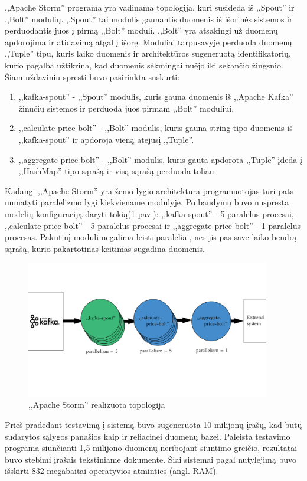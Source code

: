\documentclass{VUMIFPSkursinis}
\begin{document}
,,Apache Storm'' programa yra vadinama topologija, kuri susideda iš ,,Spout'' ir ,,Bolt'' modulių. ,,Spout'' tai modulis gaunantis duomenis
iš išorinės sistemos ir perduodantis juos į pirmą ,,Bolt'' modulį. ,,Bolt'' yra atsakingi už duomenų apdorojima ir atidavimą atgal į išorę.
Moduliai tarpusavyje perduoda duomenų ,,Tuple'' tipu, kuris laiko duomenis ir architektūros sugeneruotą identifikatorių, 
kurio pagalba užtikrina, kad duomenis sėkmingai nuėjo iki sekančio žingsnio. 
Šiam uždaviniu spresti buvo pasirinkta suskurti:
\begin{enumerate}
    \item ,,kafka-spout'' - ,,Spout'' modulis, kuris gauna duomenis iš ,,Apache Kafka'' žinučių sistemos ir perduoda juos pirmam ,,Bolt'' moduliui.
    \item ,,calculate-price-bolt'' - ,,Bolt'' modulis, kuris gauna string tipo duomenis iš ,,kafka-spout'' ir apdoroja vieną atejusį ,,Tuple''.
    \item ,,aggregate-price-bolt'' - ,,Bolt'' modulis, kuris gauta apdorota ,,Tuple'' įdeda į ,,HashMap'' tipo sąrašą ir visą sąrašą perduoda toliau.  
\end{enumerate}\par
Kadangi ,,Apache Storm'' yra žemo lygio architektūra programuotojas turi pats numatyti paralelizmo lygi kiekviename modulyje. 
Po bandymų buvo nuspresta modelių konfiguraciją daryti tokią(\ref{fig:stormtopology} pav.): ,,kafka-spout'' - 5 paralelus procesai, ,,calculate-price-bolt''
 - 5 paralelus procesai ir ,,aggregate-price-bolt'' - 1 paralelus procesas. Pakutinį moduli negalima leisti paraleliai, nes jis pas save 
 laiko bendrą sąrašą, kurio pakartotinas keitimas sugadina duomenis.\par
\begin{figure}[!htbp]
    \centering
    \includegraphics[width=0.95\textwidth]{img/topology.jpg}
    \caption{,,Apache Storm'' realizuota topologija}
    \label{fig:stormtopology}
\end{figure}
Prieš pradedant testavimą į sistemą buvo sugeneruota 10 milijonų įrašų, kad būtų sudarytos sąlygos panašios kaip ir reliacinei duomenų bazei.
Paleista testavimo programa siunčianti 1,5 milijono duomenų neribojant siuntimo greičio, rezultatai buvo stebimi įrašais tekstiniame dokumente.
Šiai sistemai pagal nutylejimą buvo išskirti 832 megabaitai operatyvios atminties (angl. RAM). 
\end{document}
